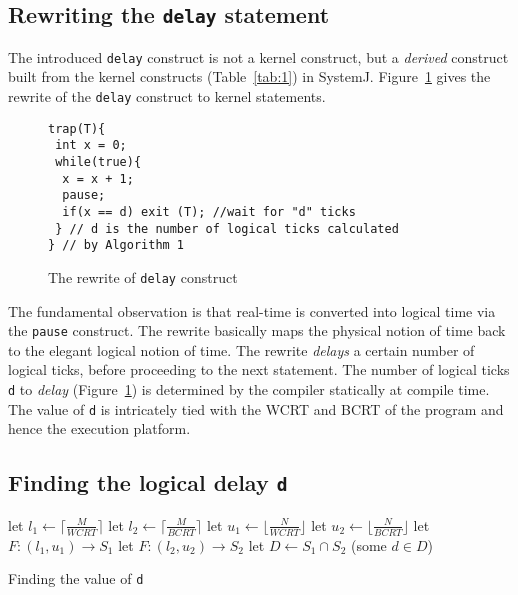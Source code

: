 \subsection{Rewriting the \texttt{delay} statement}
\label{sec:rewr-delay-stat}

The introduced \texttt{delay} construct is not a kernel construct, but a
\textit{derived} construct built from the kernel constructs
(Table~\ref{tab:1}) in SystemJ. Figure~\ref{fig:3} gives the rewrite of
the \texttt{delay} construct to kernel statements.

\begin{figure}[tb]
    \begin{minipage}{\textwidth}
      \begin{scriptsize}
\begin{verbatim}
trap(T){
 int x = 0;
 while(true){
  x = x + 1;
  pause;
  if(x == d) exit (T); //wait for "d" ticks
 } // d is the number of logical ticks calculated
} // by Algorithm 1
\end{verbatim}
      \end{scriptsize}
    \end{minipage}
    \caption{The rewrite of \texttt{delay} construct}
    \label{fig:3}
\end{figure}

The fundamental observation is that real-time is converted into logical
time via the \texttt{pause} construct. The rewrite basically maps the
physical notion of time back to the elegant logical notion of time. The
rewrite \textit{delays} a certain number of logical ticks, before
proceeding to the next statement. The number of logical ticks \texttt{d}
to \textit{delay} (Figure~\ref{fig:3}) is determined by the compiler
statically at compile time. The value of \texttt{d} is intricately tied
with the WCRT and BCRT of the program and hence the execution platform.

\subsection{Finding the logical delay \texttt{d}}
\label{sec:find-logic-delay}

\begin{algorithm}[t!]
  \begin{minipage}{1.0\linewidth}
    \SetAlgoLined
    let $l_1 \leftarrow \lceil \frac{M}{WCRT} \rceil$\;
    let $l_2 \leftarrow \lceil \frac{M}{BCRT} \rceil$\;
    let $u_1 \leftarrow \lfloor \frac{N}{WCRT} \rfloor$\;
    let $u_2 \leftarrow \lfloor \frac{N}{BCRT} \rfloor$\;
    let $F:(l_1,u_1) \rightarrow S_1$\;
    let $F:(l_2,u_2) \rightarrow S_2$\;
    let $D \leftarrow S_1 \cap S_2$\;
    \Return (some $d \in D$)\;
    \caption{Finding the value of \texttt{d}}
    \label{alg:1}
  \end{minipage}
\end{algorithm}

